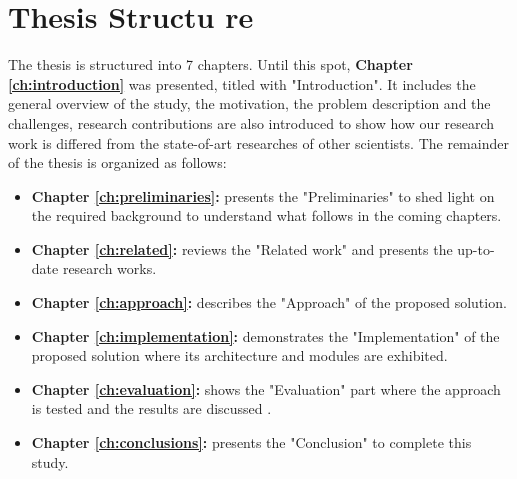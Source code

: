 \section {Thesis Structu
re}
The thesis is structured into 7 chapters. Until this spot, \textbf{Chapter \ref{ch:introduction}} was presented, titled with "Introduction". It  includes the general overview of the study, the motivation, the problem description and the challenges, research contributions are also introduced to show how our research work is differed from the state-of-art researches of other scientists. The
remainder of the thesis is organized as follows:
\begin{itemize}
	\item { \textbf{Chapter \ref{ch:preliminaries}:} presents the "Preliminaries" to shed light on the required background to understand what follows in the coming chapters.}
	
	\item {\textbf{Chapter \ref{ch:related}:}} reviews the "Related work" and presents the up-to-date research works. 
		
	\item {\textbf{Chapter \ref{ch:approach}:}} describes the "Approach" of the proposed solution. 
	
	\item {\textbf{Chapter \ref{ch:implementation}:}} demonstrates the "Implementation" of the proposed solution where its architecture and modules are exhibited.
	
	\item {\textbf{Chapter \ref{ch:evaluation}:}} shows the "Evaluation" part where the approach is tested and the results are discussed .

	\item {\textbf{Chapter \ref{ch:conclusions}:}} presents the "Conclusion" to complete this study.
\end{itemize}






